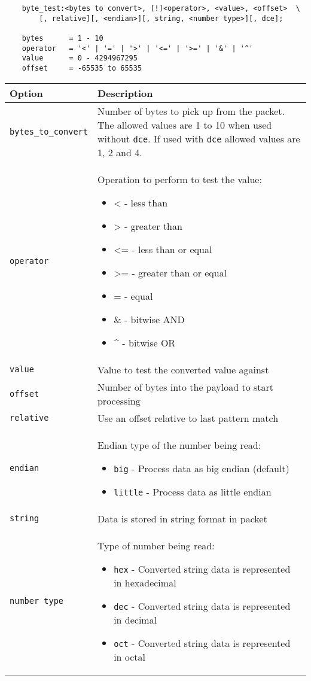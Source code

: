 \documentclass[english]{report}
\begin{document}
\footnotesize
\begin{verbatim}
    byte_test:<bytes to convert>, [!]<operator>, <value>, <offset>  \
        [, relative][, <endian>][, string, <number type>][, dce];

    bytes      = 1 - 10
    operator   = '<' | '=' | '>' | '<=' | '>=' | '&' | '^'
    value      = 0 - 4294967295
    offset     = -65535 to 65535
\end{verbatim}
\normalsize

\begin{tabular}{| l | p{4.5in} |}
\hline
{\bf Option} & {\bf Description}\\
\hline
\hline
\texttt{bytes\_to\_convert} & 

Number of bytes to pick up from the packet. The allowed values are 1 to 10 when 
used without \texttt{dce}. If used with \texttt{dce} allowed values are 1, 2 and 4.\\

\hline
\texttt{operator} & Operation to perform to test the value:
\begin{itemize}
\item \textless{} - less than
\item \textgreater{} - greater than
\item \textless{}= - less than or equal
\item \textgreater{}= - greater than or equal
\item = - equal
\item \& - bitwise AND
\item \textasciicircum{} - bitwise OR
\end{itemize}\\
\hline
\texttt{value} & Value to test the converted value against\\
\hline
\texttt{offset} & Number of bytes into the payload to start processing\\
\hline
\texttt{relative} & Use an offset relative to last pattern match\\
\hline
\texttt{endian} & Endian type of the number being read: 
\begin{itemize}
\item \texttt{big} - Process data as big endian (default)
\item \texttt{little} - Process data as little endian
\end{itemize}\\
\hline
\texttt{string} & Data is stored in string format in packet\\
\hline
\texttt{number type} & Type of number being read:
\begin{itemize}
\item \texttt{hex} - Converted string data is represented in hexadecimal
\item \texttt{dec} - Converted string data is represented in decimal
\item \texttt{oct} - Converted string data is represented in octal
\end{itemize}\\


\end{tabular}
\end{document}
